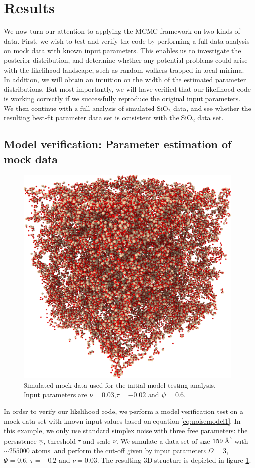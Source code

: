 \documentclass[aps,pre,twocolumn,letterpaper,floatfix,showpacs]{revtex4}
\begin{document}
\section{Results}
We now turn our attention to applying the MCMC framework on two kinds of data. First, we wish to test and verify the code by performing a full data analysis on mock data with known input parameters. This enables us to investigate the posterior distribution, and determine whether any potential problems could arise with the likelihood landscape, such as random walkers trapped in local minima. In addition, we will obtain an intuition on the width of the estimated parameter distributions. But most importantly, we will have verified that our likelihood code is working correctly if we successfully reproduce the original input parameters. We then continue with a full analysis of simulated SiO$_2$ data, and see whether the resulting best-fit parameter data set is consistent with the SiO$_2$ data set. 

\subsection{Model verification: Parameter estimation of mock data}
\begin{figure}[htb!]
\includegraphics[width=.45\textwidth]{model_test.png}
\caption{Simulated mock data used for the initial model testing analysis. Input parameters are $\nu=0.03$,$\tau=-0.02$ and $\psi=0.6$.}
\label{fig:mockdata}
\end{figure}
In order to verify our likelihood code, we perform a model verification test on a mock data set with known input values based on equation \ref{eq:noisemodel1}. In this example, we only use standard simplex noise with three free parameters: the persistence $\psi$, threshold $\tau$ and scale $\nu$. We simulate a data set of size $\SI{159} {\angstrom}^3$ with $\sim 255 000$ atoms, and perform the cut-off given by input parameters $\Omega=3$, $\Psi = 0.6$, $\tau=-0.2$ and $\nu=0.03$. The resulting 3D structure is depicted in figure \ref{fig:mockdata}. 
\end{document}
